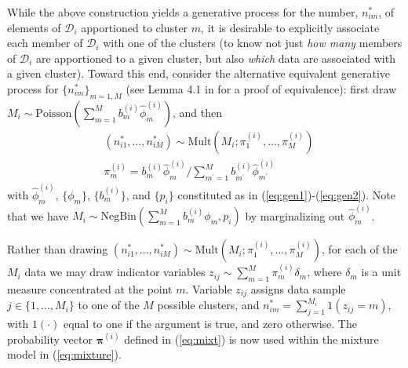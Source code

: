 \documentclass[journal]{IEEEtran}
\newcommand{\beqs}{\begin{eqnarray}}
\newcommand{\eeqs}{\end{eqnarray}}
\newcommand{\bv}{\boldsymbol{b}}
\newcommand{\lambdav}{\boldsymbol{\lambda}}
\newcommand{\piv}{\boldsymbol{\pi}}
\begin{document}

While the above construction yields a generative process for the number, $n_{im}^*$, of elements of $\bm{\mathcal{D}}_i$ apportioned to cluster $m$, it is desirable to explicitly associate each member of $\bm{\mathcal{D}}_i$ with one of the clusters (to know not just \emph{how many} members of $\bm{\mathcal{D}}_i$ are apportioned to a given cluster, but also \emph{which} data are associated with a given cluster). Toward this end, consider the alternative equivalent generative process for $\{n_{im}^*\}_{m=1,M}$ (see Lemma 4.1 in \cite{Mingyuan2012} for a proof of equivalence): first draw
$M_i\sim\mbox{Poisson}(\sum_{m=1}^M b_m^{(i)}\hat{\phi}_m^{(i)})$, %
 and then
\beqs & (n_{i1}^*,\dots,n_{iM}^*)\sim\mbox{Mult}(M_i;\pi_1^{(i)},\dots,\pi_M^{(i)})\\ &\pi_m^{(i)}=b_m^{(i)}\hat{\phi}_m^{(i)}/\sum_{m^\prime=1}^M b_{m^\prime}^{(i)}\hat{\phi}_{m^\prime}^{(i)}\label{eq:mixt}\eeqs
with $\hat{\phi}_m^{(i)}$, $\{{\phi}_m\}$, $\{b_m^{(i)}\}$, and $\{p_i\}$ constituted as in (\ref{eq:gen1})-(\ref{eq:gen2}). Note that we have $M_i\sim\mbox{NegBin}(\sum_{m=1}^M b_m^{(i)}{\phi}_m,p_i)$ by marginalizing out $\hat{\phi}_m^{(i)}$.

Rather than drawing $(n_{i1}^*,\dots,n_{iM}^*)\sim\mbox{Mult}(M_i;\pi_1^{(i)},\dots,\pi_M^{(i)})$, for each of the $M_i$ data we may draw indicator variables $z_{ij}\sim\sum_{m=1}^M\pi_m^{(i)}\delta_m$, where $\delta_m$ is a unit measure concentrated at the point $m$. Variable $z_{ij}$ assigns data sample $j\in\{1,\dots,M_i\}$ to one of the $M$ possible clusters, and $n_{im}^*=\sum_{j=1}^{M_i} 1(z_{ij}=m)$, with $1(\cdot)$ equal to one if the argument is true, and zero otherwise. The probability vector $\piv^{(i)}$ defined in (\ref{eq:mixt}) is now used within the mixture model in (\ref{eq:mixture}).

\end{document}
